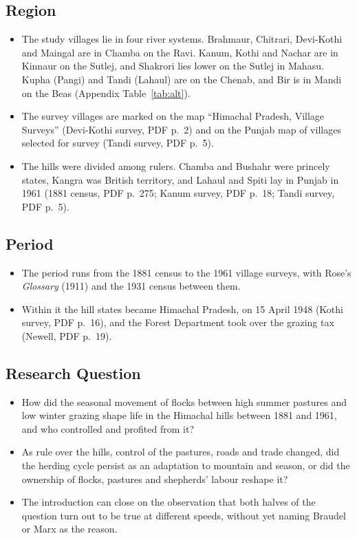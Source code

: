 \documentclass[11pt,a4paper]{article}
\newcommand{\cit}[1]{{\small(#1)}}
\begin{document}
\subsection{Region}
\begin{itemize}
\item The study villages lie in four river systems. Brahmaur, Chitrari,
  Devi-Kothi and Maingal are in Chamba on the Ravi. Kanum, Kothi and Nachar are
  in Kinnaur on the Sutlej, and Shakrori lies lower on the Sutlej in Mahasu.
  Kupha (Pangi) and Tandi (Lahaul) are on the Chenab, and Bir is in Mandi on
  the Beas \cit{Appendix Table~\ref{tab:alt}}.
\item The survey villages are marked on the map \enquote{Himachal Pradesh,
  Village Surveys} \cit{Devi-Kothi survey, PDF p.~2} and on the Punjab map of
  villages selected for survey \cit{Tandi survey, PDF p.~5}.
\item The hills were divided among rulers. Chamba and Bushahr were princely
  states, Kangra was British territory, and Lahaul and Spiti lay in Punjab in
  1961 \cit{1881 census, PDF p.~275; Kanum survey, PDF p.~18; Tandi survey,
  PDF p.~5}.
\end{itemize}

\subsection{Period}
\begin{itemize}
\item The period runs from the 1881 census to the 1961 village surveys, with
  Rose's \emph{Glossary} (1911) and the 1931 census between them.
\item Within it the hill states became Himachal Pradesh, on 15 April 1948
  \cit{Kothi survey, PDF p.~16}, and the Forest Department took over the
  grazing tax \cit{Newell, PDF p.~19}.
\end{itemize}

\subsection{Research Question}
\begin{itemize}
\item How did the seasonal movement of flocks between high summer pastures and
  low winter grazing shape life in the Himachal hills between 1881 and 1961,
  and who controlled and profited from it?
\item As rule over the hills, control of the pastures, roads and trade
  changed, did the herding cycle persist as an adaptation to mountain and
  season, or did the ownership of flocks, pastures and shepherds' labour
  reshape it?
\item The introduction can close on the observation that both halves of the
  question turn out to be true at different speeds, without yet naming
  Braudel or Marx as the reason.
\end{itemize}
\end{document}
